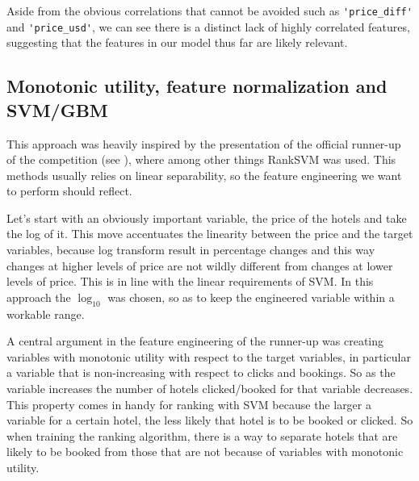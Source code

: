 \documentclass{llncs}
\begin{document}
Aside from the obvious correlations that cannot be avoided such as \verb!'price_diff'! and \verb!'price_usd'!, we can see there is a distinct lack of highly correlated features, suggesting that the features in our model thus far are likely relevant. 

\subsection{Monotonic utility, feature normalization and SVM/GBM}
This approach was heavily inspired by the presentation of the official runner-up of the competition (see \cite{Wang2013}), where among other things RankSVM was used. This methods usually relies on linear separability, so the feature engineering we want to perform should reflect.

Let's start with an obviously important variable, the price of the hotels and take the log of it. This move accentuates the linearity between the price and the target variables, because log transform result in percentage changes and this way changes at higher levels of price are not wildly different from changes at lower levels of price. This is in line with the linear requirements of SVM. In this approach the $\log_{10}$ was chosen, so as to keep the engineered variable within a workable range.

A central argument in the feature engineering of the runner-up was creating variables with monotonic utility with respect to the target variables, in particular a variable that is non-increasing with respect to clicks and bookings. So as the variable increases the number of hotels clicked/booked for that variable decreases. This property comes in handy for ranking with SVM because the larger a variable for a certain hotel, the less likely that hotel is to be booked or clicked. So when training the ranking algorithm, there is a way to separate hotels that are likely to be booked from those that are not because of variables with monotonic utility.
\end{document}
